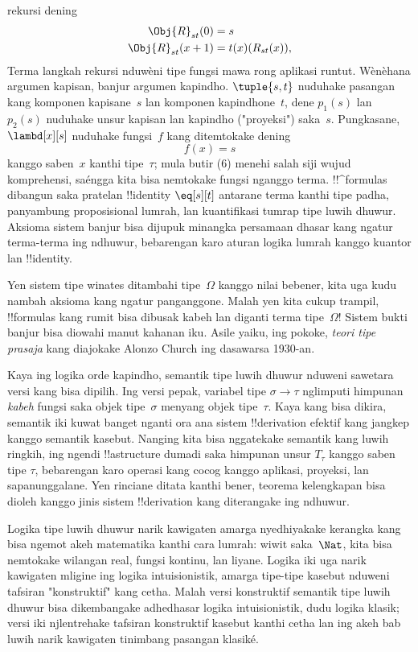 \documentclass[../../../include/open-logic-section]{subfiles}
\begin{document}
rekursi dening
\begin{align*}
\Obj{R}_{st}(0) & = s \\
\Obj{R}_{st}(x+1) & = t(x)(R_{st}(x)),
\end{align*}
Terma langkah rekursi nduwèni tipe fungsi mawa rong aplikasi runtut. Wènèhana argumen kapisan, banjur argumen kapindho.
$\tuple{s, t}$ nuduhake pasangan kang
komponen kapisane~$s$ lan komponen kapindhone~$t$,
dene $p_1(s)$ lan~$p_2(s)$ nuduhake unsur
kapisan lan kapindho ("proyeksi") saka~$s$.
Pungkasane, $\lambd[x][s]$ nuduhake
fungsi~$f$ kang ditemtokake dening
\[
f(x) = s
\]
kanggo saben~$x$ kanthi tipe~$\tau$;
mula butir (6) menehi salah siji wujud
komprehensi, saéngga kita bisa nemtokake
fungsi nganggo terma.
!!^{formula}s dibangun saka pratelan !!{identity}
$\eq[s][t]$ antarane terma kanthi tipe padha,
panyambung proposisional lumrah, lan
kuantifikasi tumrap tipe luwih dhuwur.
Aksioma sistem banjur bisa dijupuk minangka
persamaan dhasar kang ngatur terma-terma ing
ndhuwur, bebarengan karo aturan logika
lumrah kanggo kuantor lan !!{identity}.

Yen sistem tipe winates ditambahi tipe~$\Omega$
kanggo nilai bebener, kita uga kudu nambah
aksioma kang ngatur panganggone. Malah yen
kita cukup trampil, !!{formula}s kang rumit
bisa dibusak kabeh lan diganti terma tipe~$\Omega$!{}
Sistem bukti banjur bisa diowahi
manut kahanan iku. Asile yaiku, ing pokoke,
\emph{teori tipe prasaja} kang diajokake
Alonzo Church ing dasawarsa 1930-an.

Kaya ing logika orde kapindho, semantik
tipe luwih dhuwur nduweni sawetara versi
kang bisa dipilih. Ing versi pepak,
variabel tipe $\sigma \to \tau$ nglimputi
himpunan \emph{kabeh} fungsi saka objek
tipe~$\sigma$ menyang objek tipe~$\tau$.
Kaya kang bisa dikira, semantik iki
kuwat banget nganti ora ana sistem
!!{derivation} efektif kang jangkep
kanggo semantik kasebut. Nanging kita
bisa nggatekake semantik kang luwih ringkih,
ing ngendi !!a{structure} dumadi saka
himpunan unsur $T_\tau$ kanggo saben tipe
$\tau$, bebarengan karo operasi kang
cocog kanggo aplikasi, proyeksi, lan
sapanunggalane. Yen rinciane ditata
kanthi bener, teorema kelengkapan
bisa dioleh kanggo jinis sistem
!!{derivation} kang diterangake ing ndhuwur.

Logika tipe luwih dhuwur narik kawigaten
amarga nyedhiyakake kerangka kang bisa
ngemot akeh matematika kanthi cara lumrah:
wiwit saka~$\Nat$, kita bisa nemtokake
wilangan real, fungsi kontinu, lan liyane.
Logika iki uga narik kawigaten mligine
ing logika intuisionistik, amarga tipe-tipe
kasebut nduweni tafsiran "konstruktif"
kang cetha. Malah versi konstruktif
semantik tipe luwih dhuwur bisa
dikembangake adhedhasar logika intuisionistik,
dudu logika klasik; versi iki njlentrehake
tafsiran konstruktif kasebut kanthi
cetha lan ing akeh bab luwih narik
kawigaten tinimbang pasangan klasiké.
\end{document}
